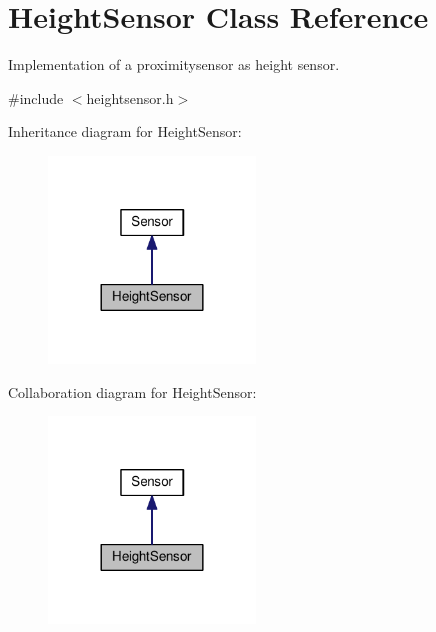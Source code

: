 \hypertarget{classHeightSensor}{}\section{Height\+Sensor Class Reference}
\label{classHeightSensor}


Implementation of a proximitysensor as height sensor.  




{\ttfamily \#include $<$heightsensor.\+h$>$}



Inheritance diagram for Height\+Sensor\+:\nopagebreak
\begin{figure}[H]
\begin{center}
\leavevmode
\includegraphics[width=156pt]{classHeightSensor__inherit__graph}
\end{center}
\end{figure}


Collaboration diagram for Height\+Sensor\+:\nopagebreak
\begin{figure}[H]
\begin{center}
\leavevmode
\includegraphics[width=156pt]{classHeightSensor__coll__graph}
\end{center}
\end{figure}
